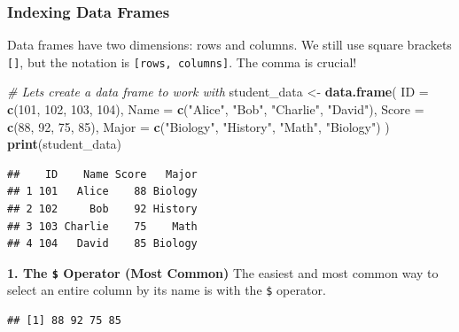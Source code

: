 \documentclass[
  11pt,
]{article}
\newenvironment{Shaded}{\begin{snugshade}}{\end{snugshade}}
\newcommand{\AttributeTok}[1]{\textcolor[rgb]{0.13,0.29,0.53}{#1}}
\newcommand{\CommentTok}[1]{\textcolor[rgb]{0.56,0.35,0.01}{\textit{#1}}}
\newcommand{\DecValTok}[1]{\textcolor[rgb]{0.00,0.00,0.81}{#1}}
\newcommand{\FunctionTok}[1]{\textcolor[rgb]{0.13,0.29,0.53}{\textbf{#1}}}
\newcommand{\NormalTok}[1]{#1}
\newcommand{\OtherTok}[1]{\textcolor[rgb]{0.56,0.35,0.01}{#1}}
\newcommand{\SpecialCharTok}[1]{\textcolor[rgb]{0.81,0.36,0.00}{\textbf{#1}}}
\newcommand{\StringTok}[1]{\textcolor[rgb]{0.31,0.60,0.02}{#1}}
\begin{document}
\subsubsection{Indexing Data Frames}\label{indexing-data-frames}

Data frames have two dimensions: rows and columns. We still use square
brackets \texttt{{[}{]}}, but the notation is
\texttt{{[}rows,\ columns{]}}. The comma is crucial!

\begin{Shaded}
\begin{Highlighting}[]
\CommentTok{\# Let\textquotesingle{}s create a data frame to work with}
\NormalTok{student\_data }\OtherTok{\textless{}{-}} \FunctionTok{data.frame}\NormalTok{(}
  \AttributeTok{ID =} \FunctionTok{c}\NormalTok{(}\DecValTok{101}\NormalTok{, }\DecValTok{102}\NormalTok{, }\DecValTok{103}\NormalTok{, }\DecValTok{104}\NormalTok{),}
  \AttributeTok{Name =} \FunctionTok{c}\NormalTok{(}\StringTok{"Alice"}\NormalTok{, }\StringTok{"Bob"}\NormalTok{, }\StringTok{"Charlie"}\NormalTok{, }\StringTok{"David"}\NormalTok{),}
  \AttributeTok{Score =} \FunctionTok{c}\NormalTok{(}\DecValTok{88}\NormalTok{, }\DecValTok{92}\NormalTok{, }\DecValTok{75}\NormalTok{, }\DecValTok{85}\NormalTok{),}
  \AttributeTok{Major =} \FunctionTok{c}\NormalTok{(}\StringTok{"Biology"}\NormalTok{, }\StringTok{"History"}\NormalTok{, }\StringTok{"Math"}\NormalTok{, }\StringTok{"Biology"}\NormalTok{)}
\NormalTok{)}
\FunctionTok{print}\NormalTok{(student\_data)}
\end{Highlighting}
\end{Shaded}

\begin{verbatim}
##    ID    Name Score   Major
## 1 101   Alice    88 Biology
## 2 102     Bob    92 History
## 3 103 Charlie    75    Math
## 4 104   David    85 Biology
\end{verbatim}

\textbf{1. The \texttt{\$} Operator (Most Common)} The easiest and most
common way to select an entire column by its name is with the
\texttt{\$} operator.

\begin{Shaded}
\end{Shaded}

\begin{verbatim}
## [1] 88 92 75 85
\end{verbatim}
\end{document}
